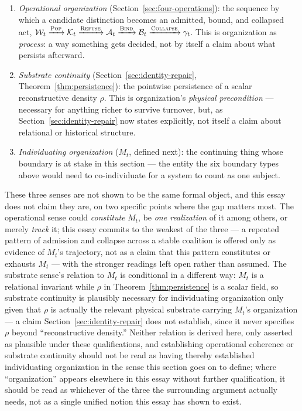 \documentclass[11pt]{article}
\newcommand{\Pop}{\textsc{Pop}}
\newcommand{\Refuse}{\textsc{Refuse}}
\newcommand{\Bind}{\textsc{Bind}}
\newcommand{\Collapse}{\textsc{Collapse}}
\begin{document}
\begin{enumerate}
\item \emph{Operational organization} (Section~\ref{sec:four-operations}): the sequence by which a candidate distinction becomes an admitted, bound, and collapsed act, $\mathcal{W}_t\xrightarrow{\Pop}\mathcal{K}_t\xrightarrow{\Refuse}\mathcal{A}_t\xrightarrow{\Bind}\mathcal{B}_t\xrightarrow{\Collapse}\gamma_t$. This is organization as \emph{process}: a way something gets decided, not by itself a claim about what persists afterward.
\item \emph{Substrate continuity} (Section~\ref{sec:identity-repair}, Theorem~\ref{thm:persistence}): the pointwise persistence of a scalar reconstructive density $\rho$. This is organization's \emph{physical precondition} --- necessary for anything richer to survive turnover, but, as Section~\ref{sec:identity-repair} now states explicitly, not itself a claim about relational or historical structure.
\item \emph{Individuating organization} ($M_t$, defined next): the continuing thing whose boundary is at stake in this section --- the entity the six boundary types above would need to co-individuate for a system to count as one subject.
\end{enumerate}

These three senses are not shown to be the same formal object, and this essay does not claim they are, on two specific points where the gap matters most. The operational sense could \emph{constitute} $M_t$, be \emph{one realization} of it among others, or merely \emph{track} it; this essay commits to the weakest of the three --- a repeated pattern of admission and collapse across a stable coalition is offered only as evidence of $M_t$'s trajectory, not as a claim that this pattern constitutes or exhausts $M_t$ --- with the stronger readings left open rather than assumed. The substrate sense's relation to $M_t$ is conditional in a different way: $M_t$ is a relational invariant while $\rho$ in Theorem~\ref{thm:persistence} is a scalar field, so substrate continuity is plausibly necessary for individuating organization only given that $\rho$ is actually the relevant physical substrate carrying $M_t$'s organization --- a claim Section~\ref{sec:identity-repair} does not establish, since it never specifies $\rho$ beyond ``reconstructive density.'' Neither relation is derived here, only asserted as plausible under these qualifications, and establishing operational coherence or substrate continuity should not be read as having thereby established individuating organization in the sense this section goes on to define; where ``organization'' appears elsewhere in this essay without further qualification, it should be read as whichever of the three the surrounding argument actually needs, not as a single unified notion this essay has shown to exist.
\end{document}
